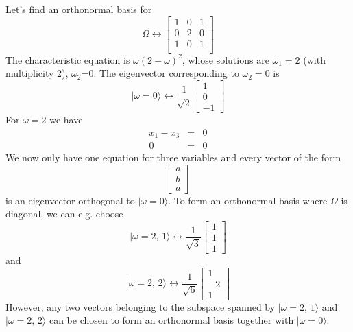 \documentclass[11pt,fleqn]{book} %
\newcommand{\ket}[1]{| #1\rangle}
\begin{document}
\begin{example}
    Let's find an orthonormal basis for 
    \begin{equation*}
        \Omega\leftrightarrow\left[\begin{array}{ccc}
            1 &0 &1\\
            0 &2&0\\
            1 &0 &1\\
        \end{array}\right]
    \end{equation*}
    The characteristic equation is $\omega(2-\omega)^2$, whose solutions are $\omega_1=2$ (with multiplicity 2), $\omega_2$=0.
    The eigenvector corresponding to $\omega_2=0$ is
    \begin{equation*}
        \ket{\omega=0}\leftrightarrow\frac{1}{\sqrt{2}}\left[
            \begin{array}{c}
                1\\
                0\\
                -1
            \end{array}\right]
    \end{equation*}
    For $\omega=2$ we have
    \begin{eqnarray*}
        x_1-x_3&=&0 \\
        0&=&0
    \end{eqnarray*}
    We now only have one equation for three variables and every vector of the form
    \begin{equation*}
        \left[\begin{array}{c}
            a\\
            b\\
            a
        \end{array}\right]
    \end{equation*}
    is an eigenvector orthogonal to $\ket{\omega=0}$. To form an orthonormal basis where $\Omega$ is diagonal, we can e.g. choose
    \begin{equation*}
        \ket{\omega=2,\,1}\leftrightarrow\frac{1}{\sqrt{3}}
        \left[\begin{array}{c}
            1\\
            1\\
            1
        \end{array}\right]
    \end{equation*}
    and
    \begin{equation*}
        \ket{\omega=2,\,2}\leftrightarrow\frac{1}{\sqrt{6}}
        \left[\begin{array}{c}
            1\\
            -2\\
            1
        \end{array}\right]
    \end{equation*}
    However, any two vectors belonging to the subspace spanned by $\ket{\omega=2,\,1}$ and $\ket{\omega=2,\,2}$ can be chosen to form
    an orthonormal basis together with $\ket{\omega=0}$.
\end{example}
\end{document}
